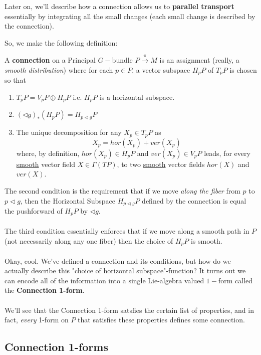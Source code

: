 \documentclass[11pt]{article}
\begin{document}
Later on, we'll describe how a connection allows us to \textbf{parallel transport} essentially by integrating all the small changes (each small change is described by the connection).

So, we make the following definition:
\begin{definition}
    A \textbf{connection} on a Principal $G-$bundle $P \xrightarrow{\pi} M$ is an assignment (really, a \emph{smooth distribution}) where for each $p \in P$, a vector subspace $H_p P$ of $T_p P$ is chosen so that 
    \begin{enumerate}[label=(\alph*)]
        \item $ T_p P = V_p P \oplus H_p P $ i.e. $H_p P$ is a horizontal subspace.
        \item $\left(\triangleleft g\right)_* (H_p P) = H_{p \triangleleft g} P$ 
        \item The unique decomposition for any $X_p \in T_p P$ as \[ X_p = hor(X_p) + ver(X_p) \] where, by definition, $hor(X_p) \in H_p P$ and $ver(X_p) \in V_p P$ leads, for every \underline{smooth} vector field $X \in \Gamma(TP)$, to two \underline{smooth} vector fields $hor(X)$ and $ver(X)$.
    \end{enumerate}
\end{definition}
The second condition is the requirement that if we move \emph{along the fiber} from $p$ to $p \triangleleft g$, then the Horizontal Subspace $H_{p \triangleleft g} P$ defined by the connection is equal the pushforward of $H_p P$ by $\triangleleft g$. 
\\
\\
The third condition essentially enforces that if we move along a smooth path in $P$ (not necessarily along any one fiber) then the choice of $H_p P$ is smooth.
\\
\\
Okay, cool. We've defined a connection and its conditions, but how do we actually describe this "choice of horizontal subspace"-function? It turns out we can encode all of the information into a single Lie-algebra valued $1-$form called the \textbf{Connection 1-form}.
\\
\\
We'll see that the Connection 1-form satsfies the certain list of properties, and in fact, \emph{every} 1-form on $P$ that satisfies these properties defines some connection. 

\subsection{Connection 1-forms}
\end{document}
